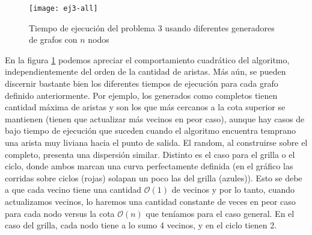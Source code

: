     \begin{figure}[H]
    	\centering
    	\texttt{[image: ej3-all]}
    	\caption{Tiempo de ejecución del problema 3 usando diferentes generadores de grafos con $n$ nodos}
    	\label{fig:ej3-all}
    \end{figure}

En la figura \ref{fig:ej3-all} podemos apreciar el comportamiento cuadrático del algoritmo, independientemente del orden de la cantidad de aristas. Más aún, se pueden discernir bastante bien
los diferentes tiempos de ejecución para cada grafo definido anteriormente. Por ejemplo, los generados como completos tienen cantidad máxima de aristas y son los que más cercanos a la cota superior se mantienen (tienen que actualizar más vecinos en peor caso), aunque hay casos de bajo tiempo de ejecución que suceden cuando el algoritmo encuentra temprano una arista muy liviana hacia el punto de salida. El random, al construirse sobre el completo, presenta una dispersión similar. Distinto es el caso para el grilla o el ciclo, donde ambos marcan una curva perfectamente definida (en el gráfico las corridas sobre ciclos (rojas) solapan un poco las del grilla (azules)). Esto se debe a que cada vecino tiene una cantidad $\mathcal{O}(1)$ de vecinos y por lo tanto, cuando actualizamos vecinos, lo haremos una cantidad constante de veces en peor caso para cada nodo versus la cota $\mathcal{O}(n)$ que teníamos para el caso general. En el caso del grilla, cada nodo tiene a lo sumo 4 vecinos, y en el ciclo tienen 2.
